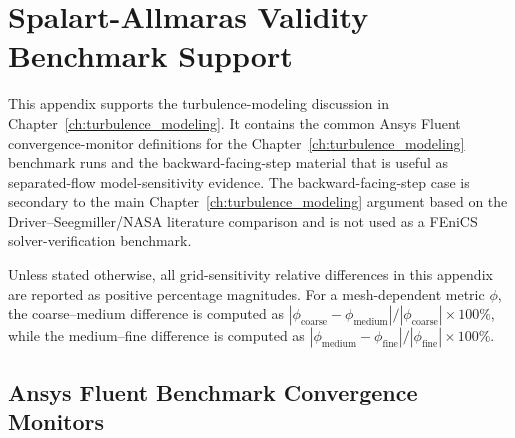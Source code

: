 \chapter{Spalart-Allmaras Validity Benchmark Support}
\label{app:A_backstep_benchmark}

This appendix supports the turbulence-modeling discussion in Chapter~\ref{ch:turbulence_modeling}. It contains the common Ansys Fluent convergence-monitor definitions for the Chapter~\ref{ch:turbulence_modeling} benchmark runs and the backward-facing-step material that is useful as separated-flow model-sensitivity evidence. The backward-facing-step case is secondary to the main Chapter~\ref{ch:turbulence_modeling} argument based on the Driver--Seegmiller/NASA literature comparison and is not used as a FEniCS solver-verification benchmark.

Unless stated otherwise, all grid-sensitivity relative differences in this appendix are reported as positive percentage magnitudes. For a mesh-dependent metric $\phi$, the coarse--medium difference is computed as $|\phi_{\mathrm{coarse}}-\phi_{\mathrm{medium}}|/|\phi_{\mathrm{coarse}}|\times100\%$, while the medium--fine difference is computed as $|\phi_{\mathrm{medium}}-\phi_{\mathrm{fine}}|/|\phi_{\mathrm{fine}}|\times100\%$.

\section{Ansys Fluent Benchmark Convergence Monitors}
\label{sec:app_A_ch2_fluent_convergence}

